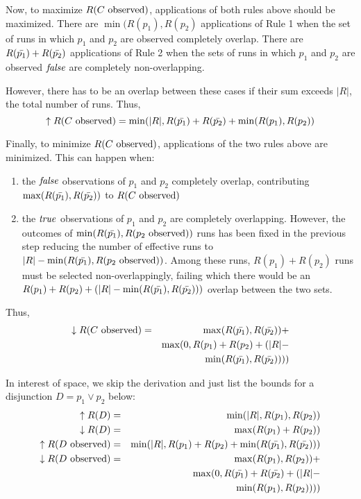 Now, to maximize $R(\text{$C$ observed})$, applications of both rules above should be
maximized.
There are $\min(R(p_1), R(p_2)$ applications of Rule 1 when the set 
of runs in which $p_1$ and $p_2$ are observed completely overlap.
There are $R(\text{$\bar{p_1}$}) + R(\text{$\bar{p_2}$})$ applications of Rule
2 when the sets of runs in which $p_1$ and $p_2$ are observed $\mathit{false}$ are
completely non-overlapping.

However, there has to be an overlap between these cases if their sum exceeds 
$|R|$, the total number of runs.  Thus,
\begin{equation}
  \uparrow R(\text{$C$ observed}) = \min(|R|, R(\text{$\bar{p_1}$}) + R(\text{$\bar{p_2}$})
                   + \min(R(p_1), R(p_2))
\end{equation}

Finally, to minimize $R(\text{$C$ observed})$, applications of the two rules above are 
minimized.  This can happen when:
\begin{enumerate}
\item the $\mathit{false}$ observations of $p_1$ and $p_2$ completely overlap, contributing
$\max(R(\text{$\bar{p_1}$}), R(\text{$\bar{p_2}$}))$ to $R(\text{$C$ observed})$
\item the $\mathit{true}$ observations of $p_1$ and $p_2$ are completely overlapping.
However, the outcomes of $\min(R(\text{$\bar{p_1}$}), R(\text{$p_2$ observed}))$ runs has
been fixed in the previous step reducing the number of effective runs to
$|R| - \min(R(\text{$\bar{p_1}$}), R(\text{$p_2$ observed}))$.  Among these runs, $R(p_1) + R(p_2)$
runs must be selected non-overlappingly, failing which there would be an
$R(p_1) + R(p_2) + (|R| - \min(R(\text{$\bar{p_1}$}), R(\text{$\bar{p_2}$})))$ overlap
between the two sets.
\end{enumerate}

Thus,
\begin{eqnarray*}
  \downarrow R(\text{$C$ observed}) &=& \max(R(\text{$\bar{p_1}$}), R(\text{$\bar{p_2}$})) + \\
            & & \max(0, R(p_1) + R(p_2) + (|R| - \\
            & & \min(R(\text{$\bar{p_1}$}), R(\text{$\bar{p_2}$}))))
\end{eqnarray*}

In interest of space, we skip the derivation and just list the bounds for a
disjunction $D = p_1 \vee p_2$ below:
\begin{eqnarray*}
  \uparrow R(D) &=& \min(|R|, R(p_1), R(p_2)) \\
  \downarrow R(D) &=& \max(R(p_1) + R(p_2)) \\
  \uparrow R(\text{$D$ observed}) &=& \min(|R|, R(p_1) + R(p_2)
                   + \min(R(\text{$\bar{p_1}$}), R(\text{$\bar{p_2}$}))) \\
  \downarrow R(\text{$D$ observed}) &=& \max(R(p_1), R(p_2)) + \\
            & & \max(0, R(\text{$\bar{p_1}$}) + R(\text{$\bar{p_2}$}) + (|R| - \\
            & & \min(R(p_1), R(p_2))))
\end{eqnarray*}

